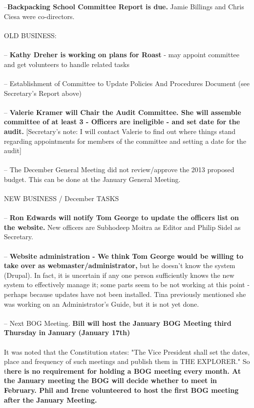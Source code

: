 \documentclass[10pt,a4paper]{article}
\begin{document}
\begin{multicols}{2}
\\
\\
--\textbf{Backpacking School Committee Report is due.}  Jamie Billings and Chris Ciesa were co-directors.
\\
\\
{\Large OLD BUSINESS:}
\\
\\
--\textbf{ Kathy Dreher is working on plans for Roast} - may appoint committee and get volunteers to handle related tasks
\\
\\
-- Establishment of Committee to Update Policies And Procedures Document (see Secretary's Report above)
\\
\\
-- \textbf{Valerie Kramer will Chair the Audit Committee.  She will assemble committee of at least 3 - Officers are ineligible - and set date for the audit.} [Secretary's note: I will contact Valerie to find out where things stand regarding appointments for members of the committee and setting a date for the audit]
\\
\\
-- The December General Meeting did not review/approve the 2013 proposed budget.  This can be done at the January General Meeting.
\\
\\
{\Large NEW BUSINESS / December TASKS}
\\
\\
-- \textbf{Ron Edwards will notify Tom George to update the officers list on the website.}  New officers are Subhodeep Moitra as Editor and Philip Sidel as Secretary.
\\
\\
-- \textbf{Website administration - We think Tom George would be willing to take over as webmaster/administrator,} but he doesn't know the system (Drupal).
In fact, it is uncertain if any one person sufficiently knows the new system to effectively manage it; some parts seem to be not working at this point - perhaps because updates have not been installed.  Tina previously mentioned she was working on an Administrator's Guide, but it is not yet done.
\\
\\
-- Next BOG Meeting.\textbf{ Bill will host the January BOG Meeting third Thursday in January (January 17th)} \\
\\
It was noted that the Constitution states: "The Vice President shall set the dates, place and frequency of such meetings and publish them in THE EXPLORER." So t\textbf{here is no requirement for holding a BOG meeting every month.  At the January meeting the BOG will decide whether to meet in February.  Phil and Irene volunteered to host the first BOG meeting after the January Meeting.}

\end{multicols}
\end{document}
